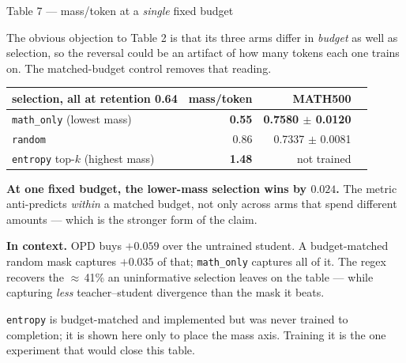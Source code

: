 \documentclass[aspectratio=169,11pt]{beamer}
\newcommand{\up}[1]{\textcolor{good}{\textbf{#1}}}
\newcommand{\dn}[1]{\textcolor{bad}{\textbf{#1}}}
\newcommand{\aside}[1]{{\footnotesize\textcolor{mut}{#1}}}
\begin{document}
\begin{frame}{Table 7 --- mass/token at a \emph{single} fixed budget}

The obvious objection to Table 2 is that its three arms differ in \emph{budget} as well as
selection, so the reversal could be an artifact of how many tokens each one trains on.
The matched-budget control removes that reading.

\vspace{0.8em}
\centering
{\small
\begin{tabular}{@{}lrrr@{}}
\toprule
\textbf{selection, all at retention 0.64} & \textbf{mass/token} & \textbf{MATH500} \\
\midrule
\texttt{math\_only} \aside{(lowest mass)}   & \dn{0.55} & \up{0.7580 $\pm$ 0.0120} \\
\texttt{random}                              & 0.86      & 0.7337 $\pm$ 0.0081 \\
\texttt{entropy} top-$k$ \aside{(highest mass)} & \up{1.48} & \aside{not trained} \\
\bottomrule
\end{tabular}}

\flushleft
\vspace{0.9em}
\textbf{At one fixed budget, the lower-mass selection wins by $0.024$.} The metric
anti-predicts \emph{within} a matched budget, not only across arms that spend different
amounts --- which is the stronger form of the claim.

\medskip
\textbf{In context.} OPD buys $+0.059$ over the untrained student. A budget-matched random
mask captures $+0.035$ of that; \texttt{math\_only} captures all of it. The regex recovers the
$\approx$\,41\% an uninformative selection leaves on the table --- while capturing \emph{less}
teacher--student divergence than the mask it beats.

\medskip
\aside{\texttt{entropy} is budget-matched and implemented but was never trained to completion;
it is shown here only to place the mass axis. Training it is the one experiment that would
close this table.}

\end{frame}
\end{document}
